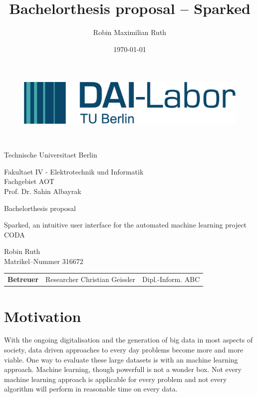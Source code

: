\documentclass[12pt,a4paper,titlepage,oneside,BCOR1cm]{scrreprt}
\date{\today}
\author{Robin Maximilian Ruth}
\title{Bachelorthesis proposal -- Sparked}
\begin{document}
\thispagestyle{empty}

\begin{figure}[htbp]
\centering
 \begin{minipage}[b]{41 mm}
   \includegraphics[width=40 mm]{./figures/DAI_Logo.png}
 \end{minipage}
\end{figure}

~\vspace{0.5cm}

\begin{center}
\begin{Huge}
Technische Universitaet Berlin\\
\vspace{1mm}
\end{Huge}{\Large Fakultaet IV - Elektrotechnik und Informatik\\
Fachgebiet AOT\\
Prof. Dr. Sahin Albayrak}\\

\vspace{26mm}
\begin{LARGE}
Bachelorthesis proposal\\
\end{LARGE}
\vspace{8mm}
\begin{LARGE}
Sparked, an intuitive user interface for the automated machine learning project CODA\\
\end{LARGE}
\vspace{3 cm}
Robin Ruth\\
Matrikel--Nummer 316672\\
\vspace{1cm}
\begin{tabular}{lll}
    \textbf{Betreuer} & Researcher Christian Geissler & Dipl.-Inform. ABC\\
\end{tabular}

\end{center}

\tableofcontents
\thispagestyle{empty}


\chapter{Motivation}
With the ongoing digitalisation and the generation of big data in most aspects of society, data driven approaches to every day problems become more and more viable. One way to evaluate these large datasets is with an machine learning approach. Machine learning, though powerfull is not a wonder box. Not every machine learning approach is applicable for every problem and not every algorithm will perform in reasonable time on every data.
\end{document}
